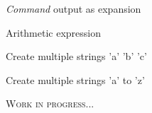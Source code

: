 \documentclass[12pt, a4paper]
{article}
\begin{document}
\begin{multicols}{3}

\begin{description}[nolistsep]
	\item[\$({\large \textit{command}})] \textit{Command} output as expansion
	\item[\$(({\large \textit{expression}}))] Arithmetic expression 
	\item[\{a,b,c\}] Create multiple strings 'a' 'b' 'c' 
	\item[\{a..z\}] Create multiple strings 'a' to 'z'
\end{description}



\end{multicols}

\begin{center}
	\Huge \textsc{Work in progress...}
\end{center}
\end{document}
